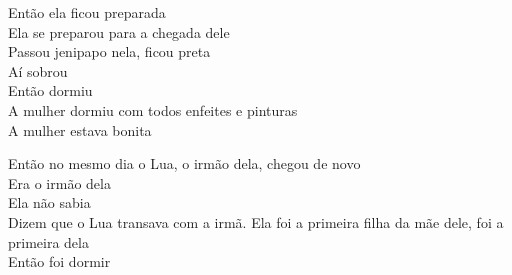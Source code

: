 \bigskip

\begin{linenumbers}\begingroup\raggedright
\noindent Então ela ficou preparada\\
Ela se preparou para a chegada dele\\
Passou jenipapo nela, ficou preta\\
Aí sobrou\\
Então dormiu\\
A mulher dormiu com todos enfeites e pinturas\\
A mulher estava bonita
\end{linenumbers}\endgroup

\bigskip

\begin{linenumbers}\begingroup\raggedright
\noindent Então no mesmo dia o Lua, o irmão dela, chegou de novo\\
Era o irmão dela\\
Ela não sabia\\
Dizem que o Lua transava com a irmã. Ela foi a primeira filha da mãe dele, foi a primeira dela\\
Então foi dormir
\end{linenumbers}\endgroup

\bigskip

